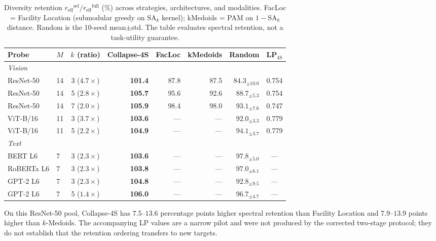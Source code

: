 \documentclass{article}
\newcommand{\reff}{\ensuremath{r_{\mathrm{eff}}}\xspace}
\newcommand{\SAk}{\ensuremath{\mathrm{SA}_k}\xspace}
\begin{document}
\begin{table}[h]
\centering
\caption{Diversity retention $\reff^{\mathrm{sel}}/\reff^{\mathrm{full}}$ (\%)
across strategies, architectures, and modalities.
FacLoc = Facility Location (submodular greedy on $\SAk$ kernel);
kMedoids = PAM on $1{-}\SAk$ distance.
Random is the 10-seed mean$\pm$std.  The table evaluates spectral retention,
not a task-utility guarantee.}
\label{tab:compression}
\small
\setlength{\tabcolsep}{2.5pt}
\begin{tabular}{llcrrrrc}
\toprule
Probe & $M$ & $k$ (ratio) & Collapse-4S & FacLoc & kMedoids & Random & LP$_{\mathrm{4S}}$ \\
\midrule
\multicolumn{8}{l}{\textit{Vision}} \\
ResNet-50 & 14 & 3 ($4.7{\times}$) & \textbf{101.4} & 87.8 & 87.5 & $84.3_{\pm10.0}$ & 0.754 \\
ResNet-50 & 14 & 5 ($2.8{\times}$) & \textbf{105.7} & 95.6 & 92.6 & $88.7_{\pm5.3}$ & 0.754 \\
ResNet-50 & 14 & 7 ($2.0{\times}$) & \textbf{105.9} & 98.4 & 98.0 & $93.1_{\pm7.6}$ & 0.747 \\
ViT-B/16  & 11 & 3 ($3.7{\times}$) & \textbf{103.6} & ---  & ---   & $92.0_{\pm3.3}$ & 0.779 \\
ViT-B/16  & 11 & 5 ($2.2{\times}$) & \textbf{104.9} & ---  & ---   & $94.1_{\pm3.7}$ & 0.779 \\
\midrule
\multicolumn{8}{l}{\textit{Text}} \\
BERT L6    & 7 & 3 ($2.3{\times}$) & \textbf{103.6} & ---  & ---   & $97.8_{\pm5.0}$ & --- \\
RoBERTa L6 & 7 & 3 ($2.3{\times}$) & \textbf{103.8} & ---  & ---   & $97.0_{\pm6.1}$ & --- \\
GPT-2 L6   & 7 & 3 ($2.3{\times}$) & \textbf{104.8} & ---  & ---   & $92.8_{\pm9.5}$ & --- \\
GPT-2 L6   & 7 & 5 ($1.4{\times}$) & \textbf{106.0} & ---  & ---   & $96.7_{\pm4.7}$ & --- \\
\bottomrule
\end{tabular}\normalsize
\end{table}

On this ResNet-50 pool, Collapse-4S has $7.5$--$13.6$ percentage points
higher spectral retention than Facility Location and $7.9$--$13.9$ points
higher than $k$-Medoids.  The accompanying LP values are a narrow pilot and
were not produced by the corrected two-stage protocol; they do not establish
that the retention ordering transfers to new targets.
\end{document}
